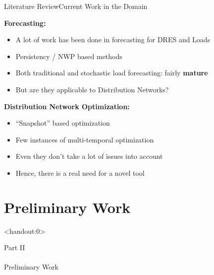 \documentclass[xcolor=svgnames,aspectratio=32,8pt]{beamer}
\begin{document}
\begin{frame}
  {Literature Review}{Current Work in the Domain}

  \textbf{Forecasting:}
  \begin{itemize}
    \item A lot of work has been done in forecasting for DRES and Loads
    \item Persistency / NWP based methods
    \item Both traditional and stochastic load forecasting: fairly \textbf{mature}
    \item But are they applicable to Distribution Networks?
  \end{itemize}\pause
  \vspace{0.5cm}
  \textbf{Distribution Network Optimization:}
  \begin{itemize}
    \item ``Snapshot'' based optimization
    \item Few instances of multi-temporal optimization
    \item Even they don't take a lot of issues into account
    \item Hence, there is a real need for a novel tool
  \end{itemize}

\end{frame}


\section
  {Preliminary Work}

\begin{frame}<handout:0>
  {}{}
  \begin{changemargin}{-1cm}{-1cm}
  \centering
  {\Huge \color{evolvdso} Part II\\\ \\Preliminary Work}
  \end{changemargin}
\end{frame}
\end{document}
